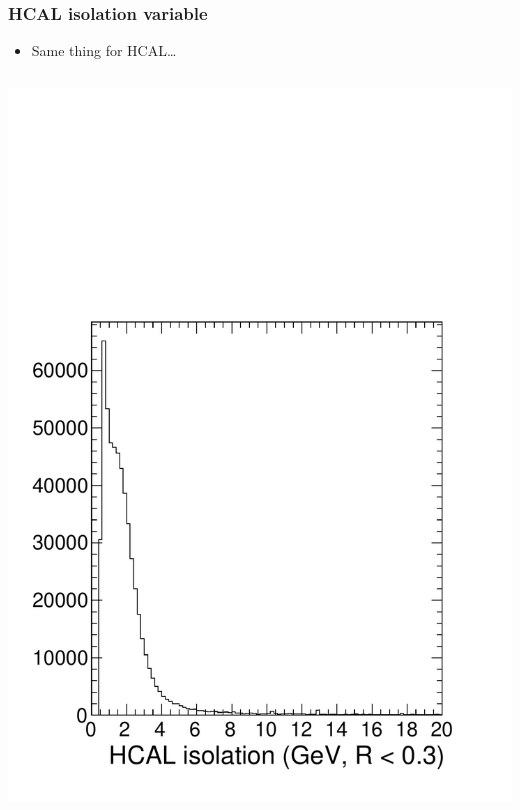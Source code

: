 \documentclass[compress]{beamer}
\begin{document}
\begin{frame}
\frametitle{HCAL isolation variable}

\begin{itemize}
\item Same thing for HCAL\ldots
\end{itemize}

\begin{columns}
\includegraphics[width=\linewidth]{hcaliso.pdf}

\end{columns}
\end{frame}
\end{document}
